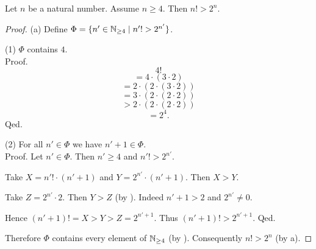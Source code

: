 \documentclass[10pt]{article}
\begin{document}
  \begin{forthel}
    \begin{proposition}
      Let $n$ be a natural number.
      Assume $n \geq 4$.
      Then $n! > 2^{n}$.
    \end{proposition}
    \begin{proof}
      (a) Define $\Phi = \{ n' \in \mathbb{N}_{\geq 4} \mid n'! > 2^{n'} \}$.
  
      (1) $\Phi$ contains $4$. \\
      Proof.
        \[  4!                                  \]
        \[    = 4 \cdot (3 \cdot 2)             \]
        \[    = 2 \cdot (2 \cdot (3 \cdot 2))   \]
        \[    = 3 \cdot (2 \cdot (2 \cdot 2))   \]
        \[    > 2 \cdot (2 \cdot (2 \cdot 2))   \]
        \[    = 2^{4}.                          \]
      Qed.
  
      (2) For all $n' \in \Phi$ we have $n' + 1 \in \Phi$. \\
      Proof.
        Let $n' \in \Phi$.
        Then $n' \geq 4$ and $n'! > 2^{n'}$.

        Take $X = n'! \cdot (n' + 1)$ and $Y = 2^{n'} \cdot (n' + 1)$.
        Then $X > Y$.

        Take $Z = 2^{n'} \cdot 2$.
        Then $Y > Z$ (by ).
        Indeed $n' + 1 > 2$ and $2^{n'} \neq 0$.

        Hence $(n' + 1)! = X > Y > Z = 2^{n' + 1}$.
        Thus $(n' + 1)! > 2^{n' + 1}$.
      Qed.
  
      Therefore $\Phi$ contains every element of $\mathbb{N}_{\geq 4}$ (by ).
      Consequently $n! > 2^{n}$ (by a).
    \end{proof}
  \end{forthel}
\end{document}
